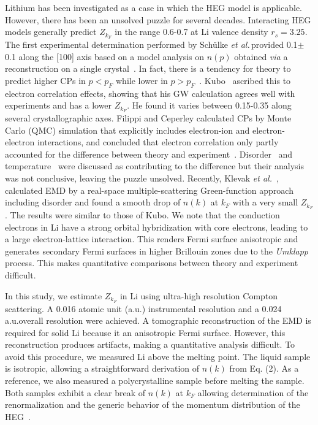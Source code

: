 \documentclass[twocolumn,showpacs,showkeys,fleqn,prl,superscriptaddress]{revtex4}%
\newcommand{\ii}[1]{\textit{#1}}
\begin{document}
Lithium has been investigated as a case in which the HEG model is applicable.
However, there has been an unsolved puzzle for several decades.
Interacting HEG models generally predict $Z_{k_F}$ in the range 0.6-0.7 at Li valence density $r_s=3.25$.
The first experimental determination performed by Sch{\"u}lke \ii{et al.}\,provided 0.1$\pm$0.1 along the [100] axis based on a model analysis on $n(p)$ obtained \ii{via} a reconstruction on a single crystal~\cite{schulke96}.
In fact, there is a tendency %
for theory to predict higher CPs in $p<p_F$ while lower in $p>p_F$~\cite{saku95}.
Kubo~\cite{kubo95,kubo97} ascribed this to electron correlation effects, showing that his GW calculation agrees well with experiments and has a lower $Z_{k_F}$. He found it varies between 0.15-0.35 along several crystallographic axes.
Filippi and Ceperley calculated CPs by Monte Carlo (QMC) simulation that explicitly includes electron-ion and electron-electron interactions, and concluded that electron correlation only partly accounted for the difference between theory and experiment~\cite{filippi99}.
Disorder~\cite{dugdale98} and temperature~\cite{stern01} were discussed as contributing to the difference but their analysis was not conclusive, leaving the puzzle unsolved.
Recently, Klevak \ii{et al.}~\cite{klevak16}, calculated EMD by a real-space multiple-scattering Green-function approach including disorder and found a smooth drop of $n(k)$ at $k_F$ with a very small $Z_{k_F}$. The results were similar to those of Kubo.
We note that the conduction electrons in Li have a strong orbital hybridization with core electrons, leading to a large electron-lattice interaction.
This renders Fermi surface anisotropic and generates secondary Fermi surfaces in higher Brillouin zones due to the {\it{Umklapp}} process.
This makes quantitative comparisons between theory and experiment difficult. 

In this study, we estimate $Z_{k_F}$ in Li using ultra-high resolution Compton scattering. A 0.016 atomic unit (a.u.) instrumental resolution and a 0.024 a.u.\;overall resolution were achieved.
A tomographic reconstruction of the EMD is required for solid Li because it an anisotropic Fermi surface. However, this reconstruction produces artifacts, making a quantitative analysis difficult.
To avoid this procedure, we measured Li above the melting point.
The liquid sample is isotropic, allowing a straightforward derivation of $n(k)$ from Eq. (2).
As a reference, we also measured a polycrystalline sample before melting the sample.
Both samples exhibit a clear break of $n(k)$ at $k_F$ allowing determination of the renormalization and the generic behavior of the momentum distribution of the HEG~\cite{holz11}.
\end{document}
